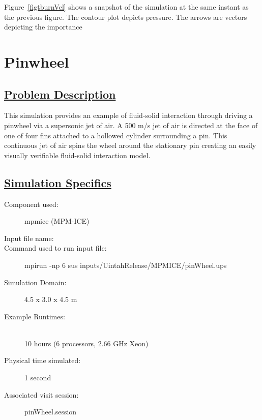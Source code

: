 Figure~\ref{figtburnVel} shows a snapshot of the simulation at the same instant as the 
previous figure.  The contour plot depicts pressure.  The arrows are vectors depicting
the importance   


%
\newpage
\section*{\center  Pinwheel}
\subsection*{\underline{Problem Description}}
This simulation provides an example of fluid-solid interaction through driving a pinwheel via a supersonic jet of air. A 500 m/s jet of air is directed at the face of one of four fins attached to a hollowed cylinder surrounding a pin. This continuous jet of air spins the wheel around the stationary pin creating an easily visually verifiable fluid-solid interaction model. 

\subsection*{\underline{Simulation Specifics}}
\begin{description}
\item [Component used:] \hfill mpmice (MPM-ICE)
\item [Input file name:] \hfill {}
\item [Command used to run input file:]\hfill 
mpirun -np 6 sus inputs/UintahRelease/MPMICE/pinWheel.ups

\item [Simulation Domain:]\hfill    4.5 x 3.0 x 4.5 m

\item [Example Runtimes:] \hfill \\
 10 hours   (6 processors, 2.66 GHz Xeon)\\

\item [Physical time simulated:] \hfill 1 second \\ 

\item [Associated visit session:] \hfill pinWheel.session

\end{description}

